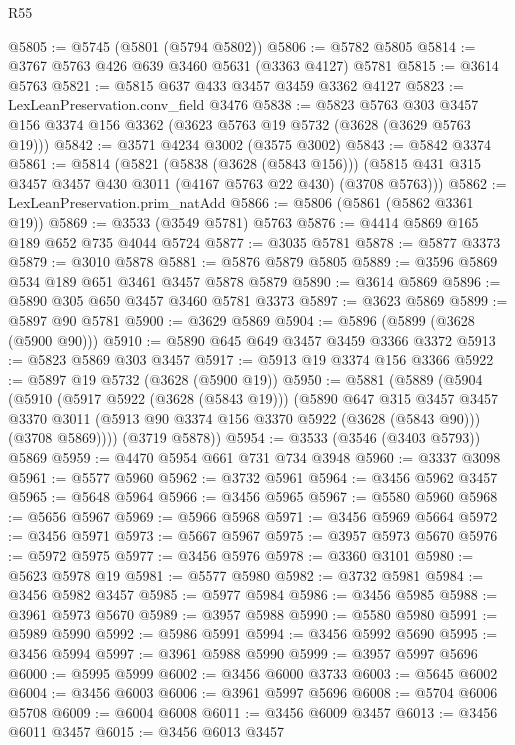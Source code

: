 \begin{lexlean}{R55}
\begin{coremodule}
@5805 := @5745 (@5801 (@5794 @5802))
@5806 := @5782 @5805
@5814 := @3767 @5763 @426 @639 @3460 @5631 (@3363 @4127) @5781
@5815 := @3614 @5763
@5821 := @5815 @637 @433 @3457 @3459 @3362 @4127
@5823 := LexLeanPreservation.conv_field @3476
@5838 := @5823
    @5763
    @303
    @3457
    @156
    @3374
    @156
    @3362
    (@3623 @5763 @19 @5732 (@3628 (@3629 @5763 @19)))
@5842 := @3571 @4234 @3002 (@3575 @3002)
@5843 := @5842 @3374
@5861 := @5814
    (@5821
      (@5838 (@3628 (@5843 @156)))
      (@5815 @431 @315 @3457 @3457 @430 @3011 (@4167 @5763 @22 @430) (@3708 @5763)))
@5862 := LexLeanPreservation.prim_natAdd
@5866 := @5806 (@5861 (@5862 @3361 @19))
@5869 := @3533 (@3549 @5781) @5763
@5876 := @4414 @5869 @165 @189 @652 @735 @4044 @5724
@5877 := @3035 @5781
@5878 := @5877 @3373
@5879 := @3010 @5878
@5881 := @5876 @5879 @5805
@5889 := @3596 @5869 @534 @189 @651 @3461 @3457 @5878 @5879
@5890 := @3614 @5869
@5896 := @5890 @305 @650 @3457 @3460 @5781 @3373
@5897 := @3623 @5869
@5899 := @5897 @90 @5781
@5900 := @3629 @5869
@5904 := @5896 (@5899 (@3628 (@5900 @90)))
@5910 := @5890 @645 @649 @3457 @3459 @3366 @3372
@5913 := @5823 @5869 @303 @3457
@5917 := @5913 @19 @3374 @156 @3366
@5922 := @5897 @19 @5732 (@3628 (@5900 @19))
@5950 := @5881
    (@5889
      (@5904
        (@5910
          (@5917 @5922 (@3628 (@5843 @19)))
          (@5890
            @647
            @315
            @3457
            @3457
            @3370
            @3011
            (@5913 @90 @3374 @156 @3370 @5922 (@3628 (@5843 @90)))
            (@3708 @5869))))
      (@3719 @5878))
@5954 := @3533 (@3546 (@3403 @5793)) @5869
@5959 := @4470 @5954 @661 @731 @734 @3948
@5960 := @3337 @3098
@5961 := @5577 @5960
@5962 := @3732 @5961
@5964 := @3456 @5962 @3457
@5965 := @5648 @5964
@5966 := @3456 @5965
@5967 := @5580 @5960
@5968 := @5656 @5967
@5969 := @5966 @5968
@5971 := @3456 @5969 @5664
@5972 := @3456 @5971
@5973 := @5667 @5967
@5975 := @3957 @5973 @5670
@5976 := @5972 @5975
@5977 := @3456 @5976
@5978 := @3360 @3101
@5980 := @5623 @5978 @19
@5981 := @5577 @5980
@5982 := @3732 @5981
@5984 := @3456 @5982 @3457
@5985 := @5977 @5984
@5986 := @3456 @5985
@5988 := @3961 @5973 @5670
@5989 := @3957 @5988
@5990 := @5580 @5980
@5991 := @5989 @5990
@5992 := @5986 @5991
@5994 := @3456 @5992 @5690
@5995 := @3456 @5994
@5997 := @3961 @5988 @5990
@5999 := @3957 @5997 @5696
@6000 := @5995 @5999
@6002 := @3456 @6000 @3733
@6003 := @5645 @6002
@6004 := @3456 @6003
@6006 := @3961 @5997 @5696
@6008 := @5704 @6006 @5708
@6009 := @6004 @6008
@6011 := @3456 @6009 @3457
@6013 := @3456 @6011 @3457
@6015 := @3456 @6013 @3457

\end{coremodule}
\end{lexlean}
